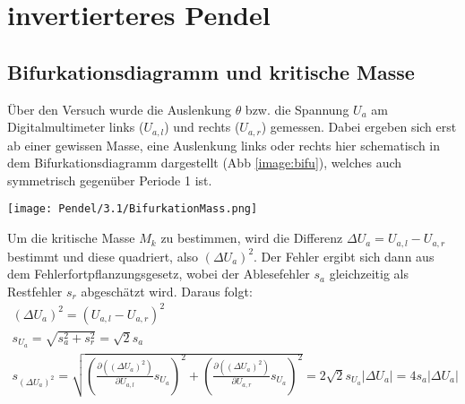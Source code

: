 

\section{invertierteres Pendel}
\label{sec:auswertungPendel}
\subsection{Bifurkationsdiagramm und kritische Masse}
\label{sub:bifuAndKritMass}
Über den Versuch wurde die Auslenkung $\theta$ bzw. die Spannung $U_a$ am Digitalmultimeter links ($U_{a,l}$) und rechts ($U_{a,r}$) gemessen. Dabei ergeben sich erst ab einer gewissen Masse, eine Auslenkung links oder rechts hier schematisch in dem Bifurkationsdiagramm dargestellt (Abb \ref{image:bifu}), welches auch symmetrisch gegenüber Periode 1 ist.
\begin{center}
    \texttt{[image: Pendel/3.1/BifurkationMass.png]}
    \label{image:bifu}
\end{center}
Um die kritische Masse $M_k$ zu bestimmen, wird die Differenz $\Delta U_a=U_{a,l}-U_{a,r}$ bestimmt und diese quadriert, also $(\Delta U_a)^2$. Der Fehler ergibt sich dann aus dem Fehlerfortpflanzungsgesetz, wobei der Ablesefehler $s_a$ gleichzeitig als Restfehler $s_r$ abgeschätzt wird. Daraus folgt:
\begin{gather}
    (\Delta U_a)^2 = (U_{a,l}-U_{a,r})^2\\
    s_{U_a}=\sqrt{s_a^2+s_r^2}=\sqrt{2}s_a\\[0,5cm]
    s_{(\Delta U_a)^2}=\sqrt{\left(\frac{\partial((\Delta U_a)^2)}{\partial U_{a,l}}s_{U_a}\right)^2 + \left(\frac{\partial((\Delta U_a)^2)}{\partial U_{a,r}}s_{U_a}\right)^2}=2\sqrt{2}s_{U_a}|\Delta U_a|=4s_a |\Delta U_a|
\end{gather}
